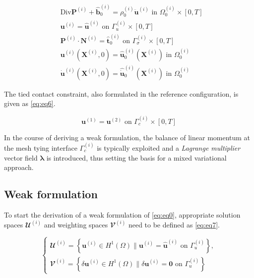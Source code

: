 \documentclass[a4paper,10pt]{article} %
\begin{document}
\begin{subequations}\label{eq:eq0}
    \begin{align}
        & \text{Div} \mathbf{P}^{(i)}+\hat{\mathbf{b}}_0^{(i)}=\rho_0^{(i)}\ddot{\mathbf{u}}^{(i)} \text{ in } \Omega_0^{(i)} \times [0, T] \label{eq:subeq1}\\
        & \mathbf{u}^{(i)} = \hat{\mathbf{u}}^{(i)} \text{ on } \Gamma_u^{(i)} \times [0, T] \label{eq:subeq2}\\
        & \mathbf{P}^{(i)} \cdot \mathbf{N}^{(i)} = \hat{\mathbf{t}}_0^{(i)} \text{ on } \Gamma_\sigma^{(i)} \times [0, T] \label{eq:subeq3} \\
        & \mathbf{u}^{(i)}\left( \mathbf{X}^{(i)}, 0\right) = \hat{\mathbf{u}}_0^{(i)}\left( \mathbf{X}^{(i)}\right) \text{ in } \Omega_0^{(i)} \label{eq:subeq4} \\
        & \dot{\mathbf{u}}^{(i)}\left( \mathbf{X}^{(i)}, 0\right) = \hat{\dot{\mathbf{u}}}_0^{(i)}\left( \mathbf{X}^{(i)}\right) \text{ in } \Omega_0^{(i)} \label{eq:subeq5}
    \end{align}
\end{subequations}

 The tied contact constraint, also formulated in the reference configuration, is given as \eqref{eq:eq6}.
 
\begin{equation}\label{eq:eq6}
    \mathbf{u}^{(1)} = \mathbf{u}^{(2)} \text{ on } \Gamma_c^{(i)} \times [0, T]
\end{equation}

In the course of deriving a weak formulation, the balance of linear momentum at the mesh tying interface $\Gamma_c^{(i)}$ is typically exploited and a \textit{Lagrange multiplier} vector field $\boldsymbol{\lambda}$ is introduced, thus setting the basis for a mixed variational approach.

\subsection{Weak formulation}

To start the derivation of a weak formulation of \eqref{eq:eq0}, appropriate solution spaces $\mathbfcal{U}^{(i)}$ and
weighting spaces $\mathbfcal{V}^{(i)}$ need to be defined as \eqref{eq:eq7}.

\begin{equation}\label{eq:eq7}
    \begin{cases}
        \mathbfcal{U}^{(i)} = \left\{ \mathbf{u}^{(i)} \in H^1(\Omega) \| \mathbf{u}^{(i)} = \hat{\mathbf{u}}^{(i)} \text{ on } \Gamma_u^{(i)}\right\},\\
        \mathbfcal{V}^{(i)} = \left\{ \delta\mathbf{u}^{(i)} \in H^1(\Omega) \| \delta\mathbf{u}^{(i)} = \mathbf{0} \text{ on } \Gamma_u^{(i)}\right\}
    \end{cases}
\end{equation}
\end{document}
